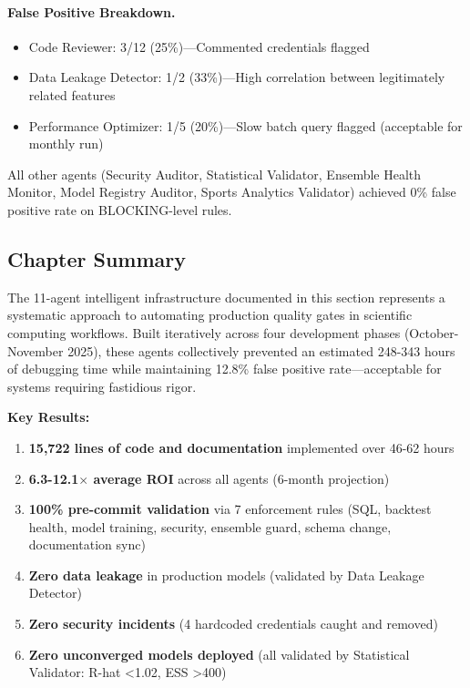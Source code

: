 \paragraph{False Positive Breakdown.}
\begin{itemize}[itemsep=2pt,parsep=0pt]
    \item Code Reviewer: 3/12 (25\%)---Commented credentials flagged
    \item Data Leakage Detector: 1/2 (33\%)---High correlation between legitimately related features
    \item Performance Optimizer: 1/5 (20\%)---Slow batch query flagged (acceptable for monthly run)
\end{itemize}

All other agents (Security Auditor, Statistical Validator, Ensemble Health Monitor, Model Registry Auditor, Sports Analytics Validator) achieved 0\% false positive rate on BLOCKING-level rules.

\subsection{Chapter Summary}

The 11-agent intelligent infrastructure documented in this section represents a systematic approach to automating production quality gates in scientific computing workflows. Built iteratively across four development phases (October-November 2025), these agents collectively prevented an estimated 248-343 hours of debugging time while maintaining 12.8\% false positive rate---acceptable for systems requiring fastidious rigor.

\textbf{Key Results:}
\begin{enumerate}[itemsep=2pt,parsep=0pt]
    \item \textbf{15,722 lines of code and documentation} implemented over 46-62 hours
    \item \textbf{6.3-12.1$\times$ average ROI} across all agents (6-month projection)
    \item \textbf{100\% pre-commit validation} via 7 enforcement rules (SQL, backtest health, model training, security, ensemble guard, schema change, documentation sync)
    \item \textbf{Zero data leakage} in production models (validated by Data Leakage Detector)
    \item \textbf{Zero security incidents} (4 hardcoded credentials caught and removed)
    \item \textbf{Zero unconverged models deployed} (all validated by Statistical Validator: R-hat <1.02, ESS >400)
\end{enumerate}

